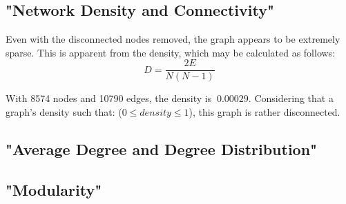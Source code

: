\subsection{"Network Density and Connectivity"}\label{subsec:"network-density-and-connectivity"}


Even with the disconnected nodes removed, the graph appears to be extremely sparse.
This is apparent from the density, which  may be calculated as follows:
\[
    D = \frac{2E}{N(N - 1)}
\]

With 8574 nodes and 10790 edges, the density is $~0.00029$.
Considering that a graph's density such that: ($0 \leq density \leq 1$), this graph is rather disconnected.

\subsection{"Average Degree and Degree Distribution"}\label{subsec:"average-degree-and-degree-distribution"}


\subsection{"Modularity"}\label{subsec:modularity}